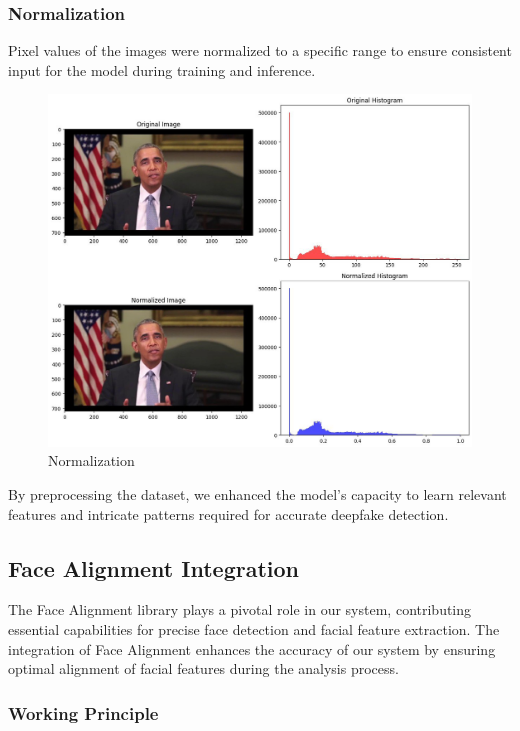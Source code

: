 \subsubsection{Normalization} Pixel values of the images were normalized to a specific range to ensure consistent input for the model during training and inference.

\begin{figure}[htbp]
    \centering
    \includegraphics[width=5in]{img/normalized.jpg}
    \caption{Normalization}
\end{figure}

\noindent By preprocessing the dataset, we enhanced the model's capacity to learn relevant features and intricate patterns required for accurate deepfake detection.

\subsection{Face Alignment Integration}

The Face Alignment library plays a pivotal role in our system, contributing essential capabilities for precise face detection and facial feature extraction. The integration of Face Alignment enhances the accuracy of our system by ensuring optimal alignment of facial features during the analysis process.

\subsubsection{Working Principle}

